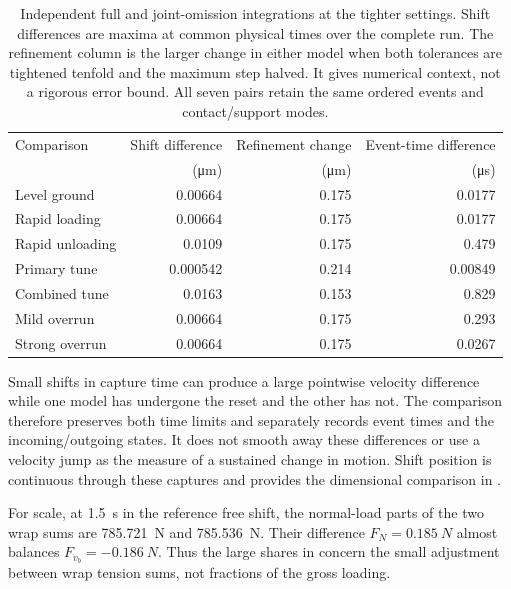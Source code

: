 \documentclass[11pt]{report}
\numberwithin{equation}{section}
\begin{document}
\begin{table}[H]
 \centering\small
 \setlength{\tabcolsep}{4pt}\renewcommand{\arraystretch}{1.15}
 \begin{tabular}{@{}lrrr@{}}
 \toprule
 Comparison & Shift difference & Refinement change & Event-time difference \\
 & (\si{\micro\metre}) & (\si{\micro\metre}) & (\si{\micro\second}) \\
 \midrule
 Level ground & 0.00664 & 0.175 & 0.0177 \\
 Rapid loading & 0.00664 & 0.175 & 0.0177 \\
 Rapid unloading & 0.0109 & 0.175 & 0.479 \\
 Primary tune & 0.000542 & 0.214 & 0.00849 \\
 Combined tune & 0.0163 & 0.153 & 0.829 \\
 Mild overrun & 0.00664 & 0.175 & 0.293 \\
 Strong overrun & 0.00664 & 0.175 & 0.0267 \\
 \bottomrule
 \end{tabular}
 \caption{Independent full and joint-omission integrations at the tighter
 settings. Shift differences are maxima at common physical times over the
 complete run. The refinement column is the larger change in either model
 when both tolerances are tightened tenfold and the maximum step halved.
 It gives numerical context, not a rigorous error bound. All seven pairs
 retain the same ordered events and contact/support modes.}
 \label{tab:belt_omission_results}
\end{table}

Small shifts in capture time can produce a large pointwise velocity
difference while one model has undergone the reset and the other has not.
The comparison therefore preserves both time limits and separately records
event times and the incoming/outgoing states. It does not smooth away these
differences or use a velocity jump as the measure of a sustained change in
motion. Shift position is continuous through these captures and provides
the dimensional comparison in .

For scale, at \SI{1.5}{s} in the reference free shift, the normal-load
parts of the two wrap sums are \SI{785.721}{N} and \SI{785.536}{N}.
Their difference \(F_N=\SI{0.185}{N}\) almost balances
\(F_{\dot v_b}=\SI{-0.186}{N}\). Thus the large shares in
 concern the small adjustment between
wrap tension sums, not fractions of the gross loading.
\end{document}
